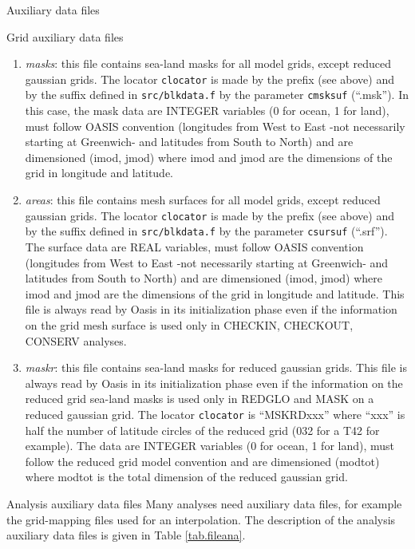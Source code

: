 \begin{subsection}{Auxiliary data files}
\begin{subsubsection}{Grid auxiliary data files}
\begin{enumerate}
\item {\em masks}: this file contains sea-land masks for all
model grids, except reduced gaussian grids. The locator {\tt clocator}
is made by the prefix (see above) and by the suffix defined in 
{\tt src/blkdata.f} by the parameter {\tt cmsksuf} (``.msk''). 
In this case, the mask data are INTEGER variables (0 for ocean, 1 for
land), must follow
OASIS convention (longitudes from West to East -not necessarily
starting at Greenwich- and latitudes from 
South to North) and are dimensioned (imod, jmod) where imod
and jmod are the dimensions of the grid in longitude and latitude.

\item {\em areas}: this file contains mesh surfaces for all
model grids, except reduced gaussian grids. The locator {\tt clocator}
is made by the prefix (see above) and by the suffix defined in 
{\tt src/blkdata.f} by the parameter {\tt csursuf} (``.srf''). 
The surface data are REAL variables, must follow
OASIS convention (longitudes from West to East -not necessarily
starting at Greenwich- and latitudes from 
South to North) and are dimensioned (imod, jmod) where imod
and jmod are the dimensions of the grid in longitude and
latitude. This file is always read by Oasis in its initialization
phase even if the information on the grid mesh surface is used only in
CHECKIN, CHECKOUT, CONSERV analyses.

\item {\em maskr}: this file contains sea-land masks for reduced
gaussian grids.  This file is always read by Oasis in its initialization
phase even if the information on the reduced grid sea-land masks is
used only in REDGLO and MASK on a reduced gaussian grid. The locator 
{\tt clocator} is ``MSKRDxxx'' where ``xxx'' is half the number of 
latitude circles of the reduced grid (032 for a T42 for example). 
The data are INTEGER variables (0 for ocean, 1 for
land), must follow the reduced grid model 
convention and are dimensioned (modtot) where modtot is the total
dimension of the reduced gaussian grid.  

\end{enumerate}

\end{subsubsection}

\begin{subsubsection}{Analysis auxiliary data files}
\label{subsub.analaux}
Many analyses need auxiliary data files, for example the
grid-mapping files used for an interpolation. The description 
of the analysis auxiliary data files is given in Table
\ref{tab.fileana}.


\end{subsubsection}
\end{subsection}
